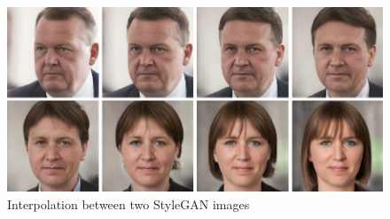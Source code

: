 \begin{figure}[h!]
  \includegraphics[width=\textwidth]{fig/stylegan/interpolation}
  \caption{Interpolation between two StyleGAN images}
  \label{StyleGAN-interpolation}
\end{figure}






%




